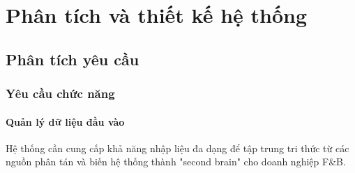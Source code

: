 \section{Phân tích và thiết kế hệ
thống}\label{phuxe2n-tuxedch-vuxe0-thiux1ebft-kux1ebf-hux1ec7-thux1ed1ng}

\subsection{Phân tích yêu cầu}\label{phuxe2n-tuxedch-yuxeau-cux1ea7u}

\subsubsection{Yêu cầu chức
năng}\label{yuxeau-cux1ea7u-chux1ee9c-nux103ng}

\paragraph{Quản lý dữ liệu đầu
vào}\label{quux1ea3n-luxfd-dux1eef-liux1ec7u-ux111ux1ea7u-vuxe0o}

Hệ thống cần cung cấp khả năng nhập liệu đa dạng để tập trung tri thức
từ các nguồn phân tán và biến hệ thống thành "second brain" cho doanh
nghiệp F\&B.

